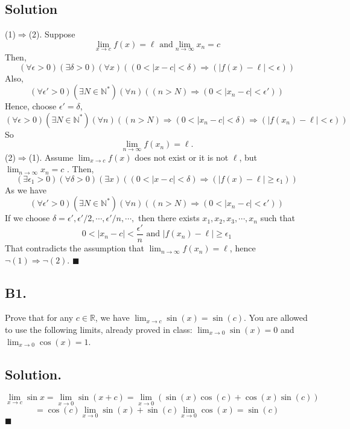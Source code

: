 \documentclass{article}
\begin{document}
\subsection*{Solution}
(1)$\Rightarrow$(2). \newline
Suppose 
\[\lim_{x\to c} f(x)=\ell\text{ and} \lim_{n\to\infty}x_n=c\]
Then, \[(\forall \epsilon>0)(\exists \delta>0)(\forall x)((0<|x-c|<\delta)\Rightarrow(|f(x)-\ell|<\epsilon))\]
Also,
\[(\forall \epsilon'>0)(\exists N\in \mathbb{N}^*)(\forall n)((n>N)\Rightarrow(0<|x_n-c|<\epsilon'))\]
Hence, choose $\epsilon'=\delta$,
\[(\forall \epsilon>0)(\exists N\in\mathbb{N}^*)(\forall n)((n>N)\Rightarrow(0<|x_n-c|<\delta)\Rightarrow(|f(x_n)-\ell|<\epsilon))\]
So \[\lim_{n\to\infty}f(x_n)=\ell.\]
(2)$\Rightarrow$(1).\newline
Assume $\lim_{x\to c} f(x)$ does not exist or it is not $\ell$, but $\lim_{n\to\infty}x_n=c$ .
Then, 
\[(\exists \epsilon_1>0)(\forall \delta>0)(\exists x)((0<|x-c|<\delta)\Rightarrow(|f(x)-\ell|\geq \epsilon_1))\]
As we have
\[(\forall \epsilon'>0)(\exists N\in \mathbb{N}^*)(\forall n)((n>N)\Rightarrow(0<|x_n-c|<\epsilon'))\]
If we choose $\delta=\epsilon',\epsilon'/2,\cdots,\epsilon'/n,\cdots,$ then there exists $x_1,x_2,x_3,\cdots,x_n$ such that 
\[0<|x_n-c|<\frac{\epsilon'}{n}\text{  and  }|f(x_n)-\ell|\geq \epsilon_1\]
That contradicts the assumption that $\lim_{n\to\infty}f(x_n)=\ell$, hence $\lnot (1)\Rightarrow\lnot(2)$.
$\blacksquare$
\subsection*{B1.}
Prove that for any $c\in\mathbb{R}$, we have $\lim _{x\to c} \sin{(x)}=\sin{(c)}$. You are allowed to use the following limits, already proved in class: $\lim _{x\to 0} \sin{(x)}=0$ and $\lim _{x\to 0} \cos{(x)}=1$.
\subsection*{Solution.}

\[\lim _{x\to c}\sin{x}=\lim_{x\to 0} \sin{(x+c)}=\lim_{x\to 0}(\sin{(x)}\cos{(c)}+\cos{(x)}\sin{(c)})\]
\[=\cos(c)\lim_{x\to 0} \sin(x)+\sin(c)\lim_{x\to 0} \cos(x)=\sin(c)\]
$\blacksquare$
\end{document}

